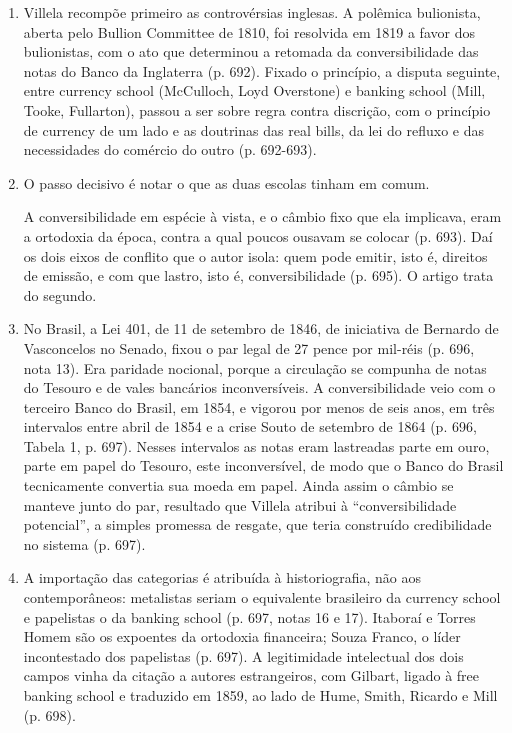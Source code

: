 \begin{enumerate}[leftmargin=*,nosep]
\item Villela recompõe primeiro as controvérsias inglesas. A polêmica bulionista,
aberta pelo Bullion Committee de 1810, foi resolvida em 1819 a favor dos
bulionistas, com o ato que determinou a retomada da conversibilidade das notas do
Banco da Inglaterra (p. 692). Fixado o princípio, a disputa seguinte, entre
currency school (McCulloch, Loyd Overstone) e banking school (Mill, Tooke,
Fullarton), passou a ser sobre regra contra discrição, com o princípio de
currency de um lado e as doutrinas das real bills, da lei do refluxo e das
necessidades do comércio do outro (p. 692-693).

\item O passo decisivo é notar o que as duas escolas tinham em comum.


A conversibilidade em espécie à vista, e o câmbio fixo que ela implicava, eram a
ortodoxia da época, contra a qual poucos ousavam se colocar (p. 693). Daí os dois
eixos de conflito que o autor isola: quem pode emitir, isto é, direitos de
emissão, e com que lastro, isto é, conversibilidade (p. 695). O artigo trata do
segundo.

\item No Brasil, a Lei 401, de 11 de setembro de 1846, de iniciativa de Bernardo
de Vasconcelos no Senado, fixou o par legal de 27 pence por mil-réis (p. 696,
nota 13). Era paridade nocional, porque a circulação se compunha de notas do
Tesouro e de vales bancários inconversíveis. A conversibilidade veio com o
terceiro Banco do Brasil, em 1854, e vigorou por menos de seis anos, em três
intervalos entre abril de 1854 e a crise Souto de setembro de 1864 (p. 696,
Tabela 1, p. 697). Nesses intervalos as notas eram lastreadas parte em ouro,
parte em papel do Tesouro, este inconversível, de modo que o Banco do Brasil
tecnicamente convertia sua moeda em papel. Ainda assim o câmbio se manteve junto
do par, resultado que Villela atribui à ``conversibilidade potencial'', a simples
promessa de resgate, que teria construído credibilidade no sistema (p. 697).

\item A importação das categorias é atribuída à historiografia, não aos
contemporâneos: metalistas seriam o equivalente brasileiro da currency school e
papelistas o da banking school (p. 697, notas 16 e 17). Itaboraí e Torres Homem
são os expoentes da ortodoxia financeira; Souza Franco, o líder incontestado dos
papelistas (p. 697). A legitimidade intelectual dos dois campos vinha da citação
a autores estrangeiros, com Gilbart, ligado à free banking school e traduzido em
1859, ao lado de Hume, Smith, Ricardo e Mill (p. 698).


\end{enumerate}
